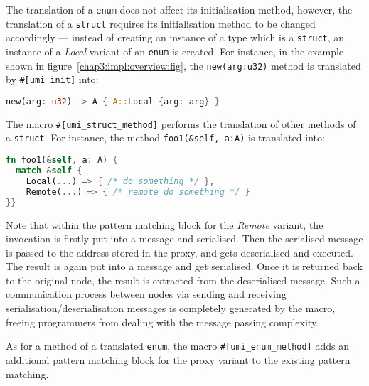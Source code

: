 The translation of a \lstinline{enum} does not affect its initialisation method, however, the translation of a \lstinline{struct} requires its initialisation method to be changed accordingly --- instead of creating an instance of a type which is a \lstinline{struct}, an instance of a \textit{Local} variant of an \lstinline{enum} is created. For instance, in the example shown in figure~\ref{chap3:impl:overview:fig}, the \lstinline{new(arg:u32)} method is translated by \lstinline{#[umi_init]} into:
\begin{lstlisting}[language=Rust, style=boxed, basicstyle=\footnotesize\ttfamily]
new(arg: u32) -> A { A::Local {arg: arg} }
\end{lstlisting}

The macro \lstinline{#[umi_struct_method]} performs the translation of other methods of a \lstinline{struct}. For instance, the method \lstinline{foo1(&self, a:A)} is translated into:
\begin{lstlisting}[language=Rust, style=boxed, basicstyle=\footnotesize\ttfamily]
fn foo1(&self, a: A) {
  match &self {
    Local(...) => { /* do something */ },
    Remote(...) => { /* remote do something */ }
}}
\end{lstlisting}
Note that within the pattern matching block for the \emph{Remote} variant, the invocation is firstly put into a message and serialised. Then the serialised message is passed to the address stored in the proxy, and gets deserialised and executed. The result is again put into a message and get serialised. Once it is returned back to the original node, the result is extracted from the deserialised message. Such a communication process between nodes via sending and receiving serialisation/deserialisation messages is completely generated by the macro, freeing programmers from dealing with the message passing complexity.

As for a method of a translated \lstinline{enum}, the macro \lstinline{#[umi_enum_method]} adds an additional pattern matching block for the proxy variant to the existing pattern matching.

